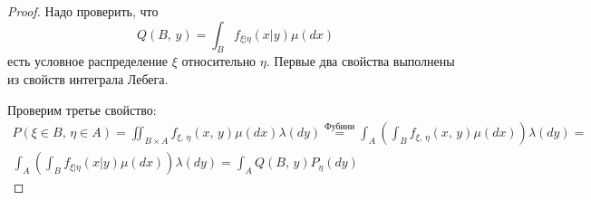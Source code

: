 \begin{proof}
	Надо проверить, что
	\[Q(B,\, y) = \int_Bf_{\xi | \eta}(x|y)\mu(dx)\]
	есть условное распределение $\xi$ относительно $\eta$. Первые два свойства выполнены из свойств интеграла Лебега.

	Проверим третье свойство:
	\begin{align*}
		P(\xi \in B,\, \eta \in A) = \iint_{B \times A} f_{\xi,\, \eta}(x,\, y)\mu(dx)\lambda(dy) \stackrel{\text{Фубини}}{=} \int_A\left(\int_B f_{\xi,\, \eta}(x,\,y)\mu(dx)\right)\lambda(dy) = \\
		\int_A\left(\int_B f_{\xi | \eta}(x | y)\mu(dx)\right)\lambda(dy) = \int_A Q(B,\,y)P_\eta(dy)
	\end{align*}
\end{proof}
